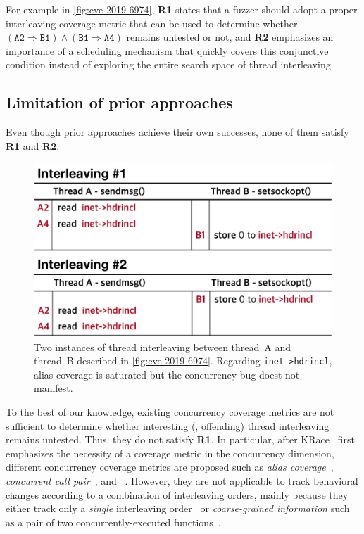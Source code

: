 For example in \autoref{fig:cve-2019-6974}, \textbf{R1} states that a
fuzzer should adopt a proper interleaving coverage metric that can be
used to determine whether
$(\texttt{A2} \Rightarrow \texttt{B1}) \wedge (\texttt{B1} \Rightarrow
\texttt{A4})$ remains untested or not, and \textbf{R2} emphasizes an
importance of a scheduling mechanism that quickly covers this
conjunctive condition instead of exploring the entire search space of
thread interleaving.



\subsection{Limitation of prior approaches}
\label{ss:existingapproaches}

Even though prior approaches achieve their own successes, none of them
satisfy \textbf{R1} and \textbf{R2}.

%
\begin{figure}[t]
  \centering
  \includegraphics[width=0.95\linewidth]{fig/alias-coverage.pdf}
  \caption{Two instances of thread interleaving between thread~A and
    thread~B described in \autoref{fig:cve-2019-6974}. Regarding
    \texttt{inet->hdrincl}, alias coverage is saturated but the
    concurrency bug doest not manifest.}
  \label{fig:alias-coverage}
\end{figure}
%
To the best of our knowledge, existing concurrency coverage metrics
are not sufficient to determine whether interesting (\ie, offending)
thread interleaving remains untested. Thus, they do not satisfy
\textbf{R1}.
%
In particular, after KRace~\cite{krace} first emphasizes the necessity
of a coverage metric in the concurrency dimension, different
concurrency coverage metrics are proposed such as \textit{alias
  coverage}~\cite{krace}, \textit{concurrent call
  pair}~\cite{conzzer}, and \textit{}~\cite{muzz}.
%
However, they are not applicable to track behavioral changes according
to a combination of interleaving orders, mainly because they either
track only a \textit{single} interleaving order~\cite{krace, muzz} or
\textit{coarse-grained information} such as a pair of two
concurrently-executed functions~\cite{conzzer}.

